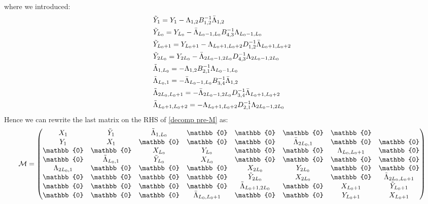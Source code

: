 where we introduced:
\begin{equation}
    \begin{split}
       & \Tilde{Y}_1 = Y_1 - \Lambda_{1,2} B^{-1}_{1,2} \Bar{\Lambda}_{1,2} \\
       & \Tilde{Y}_{L_0} = Y_{L_0} - \Bar{\Lambda}_{L_0 - 1,L_0} B^{-1}_{4,3} \Lambda_{L_0 - 1, L_0} \\
       & \Tilde{Y}_{L_0 + 1} = Y_{L_0 + 1} - \Lambda_{L_0 + 1,L_0 + 2} D^{-1}_{1,2} \Bar{\Lambda}_{L_0 + 1,L_0 + 2} \\
       & \Tilde{Y}_{2L_0} = Y_{2L_0} - \Bar{\Lambda}_{2L_0 - 1,2L_0} D^{-1}_{4,3} \Lambda_{2L_0 - 1, 2L_0} \\
       & \Tilde{\Lambda}_{1, L_0} = - \Lambda_{1,2} B^{-1}_{2,1} \Lambda_{L_0 - 1, L_0} \\
       & \Tilde{\Lambda}_{L_0, 1} = - \Bar{\Lambda}_{L_0 - 1, L_0} B_{3,4}^{-1} \Bar{\Lambda}_{1,2} \\
       & \Tilde{\Lambda}_{2L_0, L_0 + 1} = - \Bar{\Lambda}_{2L_0 - 1, 2L_0} D_{3,4}^{-1} \Bar{\Lambda}_{L_0 + 1, L_0 + 2} \\
       & \Tilde{\Lambda}_{L_0 + 1, L_0 + 2} = -  \Lambda_{L_0 + 1, L_0 + 2} D^{-1}_{2,1} \Lambda_{2L_0 - 1, 2L_0}
    \end{split}
\end{equation}
Hence we can rewrite the last matrix on the RHS of \eqref{decomp pre-M} as:
\begin{equation}
    \mathcal{M} = \begin{pmatrix}
         X_1 & \Tilde{Y}_1 & \Tilde{\Lambda}_{1, L_0} & \mathbb{0}  & \mathbb{0}  & \mathbb{0} & \mathbb{0}  \\
        Y_1 & X_1 & \mathbb{0} & \mathbb{0}  & \mathbb{0} & \Bar{\Lambda}_{2L_0, 1} & \mathbb{0}  & \mathbb{0} \\
        \mathbb{0} & \mathbb{0} & X_{L_0} & Y_{L_0}  & \mathbb{0}  & \mathbb{0} & \Lambda_{L_0, L_0 + 1}  & \mathbb{0} \\
        \mathbb{0} & \Tilde{\Lambda}_{L_0, 1} & \Tilde{Y}_{L_0} & X_{L_0}  & \mathbb{0}  & \mathbb{0} & \mathbb{0}  & \mathbb{0} \\
        \Lambda_{2L_0, 1} & \mathbb{0} & \mathbb{0} & \mathbb{0} & X_{2L_0} & Y_{2L_0} & \mathbb{0} & \mathbb{0} \\
        \mathbb{0} & \mathbb{0} & \mathbb{0} & \mathbb{0} & \Tilde{Y}_{2L_0} & X_{2L_0} & \mathbb{0} & \Tilde{\Lambda}_{2L_0, L_0 + 1} \\
        \mathbb{0} & \mathbb{0} & \mathbb{0} & \mathbb{0} & \Tilde{\Lambda}_{L_0 + 1, 2L_0} & \mathbb{0} & X_{L_0 + 1} & \Tilde{Y}_{L_0 + 1} \\
        \mathbb{0} & \mathbb{0} & \mathbb{0} & \Bar{\Lambda}_{L_0, L_0 + 1} & \mathbb{0} & \mathbb{0} & Y_{L_0 + 1} & X_{L_0 + 1} \\
    \end{pmatrix}
\end{equation}
